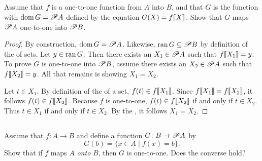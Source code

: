 \documentclass{report}
\begin{document}
\subsection{}%
\label{sub:exercise-3.28}

Assume that $f$ is a one-to-one function from $A$ into $B$, and that $G$ is the
  function with $\mathop{\text{dom}}{G} = \mathscr{P}A$ defined by the equation
  $G(X) = f\!\left\llbracket X\right\rrbracket$.
Show that $G$ maps $\mathscr{P}A$ one-to-one into $\mathscr{P}B$.

\begin{proof}

  By construction, $\mathop{\text{dom}}{G} = \mathscr{P}A$.
  Likewise, $\mathop{\text{ran}}{G} \subseteq \mathscr{P}B$ by definition of the
     of sets.
  Let $y \in \mathop{\text{ran}}{G}$.
  Then there exists an $X_1 \in \mathscr{P}A$ such that $f\!\left\llbracket X_1\right\rrbracket = y$.
  To prove $G$ is one-to-one into $\mathscr{P}B$, assume there exists an
    $X_2 \in \mathscr{P}A$ such that $f\!\left\llbracket X_2\right\rrbracket = y$.
  All that remains is showing $X_1 = X_2$.

  Let $t \in X_1$.
  By definition of the  of a set, $f(t) \in f\!\left\llbracket X_1\right\rrbracket$.
  Since $f\!\left\llbracket X_1\right\rrbracket = f\!\left\llbracket X_2\right\rrbracket$, it follows $f(t) \in f\!\left\llbracket X_2\right\rrbracket$.
  Because $f$ is one-to-one, $f(t) \in f\!\left\llbracket X_2\right\rrbracket$ if and only if $t \in X_2$.
  Thus $t \in X_1$ if and only if $t \in X_2$.
  By the , it follows $X_1 = X_2$.

\end{proof}

\subsection{}%
\label{sub:exercise-3.29}

Assume that $f \colon A \rightarrow B$ and define a function
  $G \colon B \rightarrow \mathscr{P}A$ by
  \begin{equation}
    \label{sub:exercise-3.29-eq1}
    G(b) = \{x \in A \mid f(x) = b\}.
  \end{equation}
Show that if $f$ maps $A$ \textit{onto} $B$, then $G$ is one-to-one.
Does the converse hold?
\end{document}
